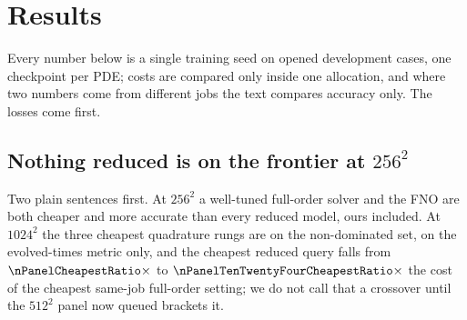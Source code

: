 \section{Results}
\label{sec:results}

Every number below is a single training seed on opened development cases, one
checkpoint per PDE; costs are compared only inside one allocation, and where two
numbers come from different jobs the text compares accuracy only. The losses
come first.

\subsection{Nothing reduced is on the frontier at $256^2$}
\label{sec:exp:panel}

Two plain sentences first. At $256^2$ a well-tuned full-order solver and the
FNO are both cheaper and more accurate than every reduced model, ours
included. At $1024^2$ the three cheapest quadrature rungs are on the
non-dominated set, on the evolved-times metric only, and the cheapest reduced
query falls from $\nPanelCheapestRatio\times$ to
$\nPanelTenTwentyFourCheapestRatio\times$ the cost of the cheapest same-job
full-order setting; we do not call that a crossover until the $512^2$ panel
now queued brackets it.

